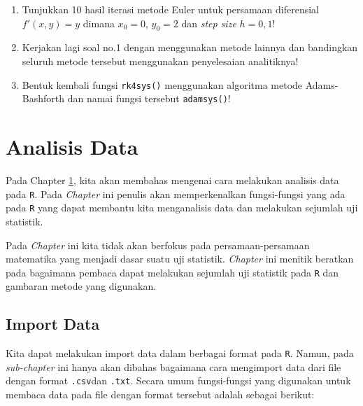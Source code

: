 \documentclass[]{book}
\providecommand{\tightlist}{%
  \setlength{\itemsep}{0pt}\setlength{\parskip}{0pt}}
\theoremstyle{definition}
\theoremstyle{definition}
\theoremstyle{definition}
\theoremstyle{remark}
\begin{document}
\begin{enumerate}
\def\labelenumi{\arabic{enumi}.}
\tightlist
\item
  Tunjukkan 10 hasil iterasi metode Euler untuk persamaan diferensial \(f'\left(x,y\right)=y\) dimana \(x_0=0\), \(y_0=2\) dan \emph{step size} \(h=0,1\)!
\item
  Kerjakan lagi soal no.1 dengan menggunakan metode lainnya dan bandingkan seluruh metode tersebut menggunakan penyelesaian analitiknya!
\item
  Bentuk kembali fungsi \texttt{rk4sys()} menggunakan algoritma metode Adams-Bashforth dan namai fungsi tersebut \texttt{adamsys()}!
\end{enumerate}

\hypertarget{dataanalysis}{%
\chapter{Analisis Data}\label{dataanalysis}}

Pada Chapter \ref{dataanalysis}, kita akan membahas mengenai cara melakukan analisis data pada \texttt{R}. Pada \emph{Chapter} ini penulis akan memperkenalkan fungsi-fungsi yang ada pada \texttt{R} yang dapat membantu kita menganalisis data dan melakukan sejumlah uji statistik.

Pada \emph{Chapter} ini kita tidak akan berfokus pada persamaan-persamaan matematika yang menjadi dasar suatu uji statistik. \emph{Chapter} ini menitik beratkan pada bagaimana pembaca dapat melakukan sejumlah uji statistik pada \texttt{R} dan gambaran metode yang digunakan.

\hypertarget{importdata}{%
\section{Import Data}\label{importdata}}

Kita dapat melakukan import data dalam berbagai format pada \texttt{R}. Namun, pada \emph{sub-chapter} ini hanya akan dibahas bagaimana cara mengimport data dari file dengan format \texttt{.csv}dan \texttt{.txt}. Secara umum fungsi-fungsi yang digunakan untuk membaca data pada file dengan format tersebut adalah sebagai berikut:
\end{document}
